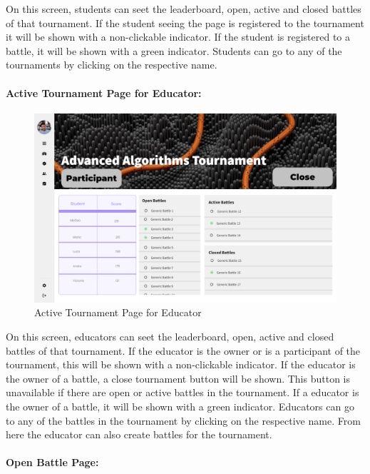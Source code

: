 \documentclass{article}
\begin{document}
On this screen, students can seet the leaderboard, open, active and closed battles of that tournament.
If the student seeing the page is registered to the tournament it will be shown with a non-clickable indicator.
If the student is registered to a battle, it will be shown with a green indicator. Students can go to any
of the tournaments by clicking on the respective name. 

\paragraph{Active Tournament Page for Educator:}

\begin{figure}[H]
    \centering
    \includegraphics[width=1\textwidth]{images/UI/Tournament Page Active Educator.png}
    \caption{Active Tournament Page for Educator}
    \label{fig:ActiveTournamentPageForEducator}
\end{figure}

On this screen, educators can seet the leaderboard, open, active and closed battles of that tournament.
If the educator is the owner or is a participant of the tournament, this will be shown with a non-clickable indicator.
If the educator is the owner of a battle, a close tournament button will be shown. This button is unavailable
if there are open or active battles in the tournament.
If a educator is the owner of a battle, it will be shown with a green indicator. Educators can go to any
of the battles in the tournament by clicking on the respective name.
From here the educator can also create battles for the tournament.

\paragraph{Open Battle Page:}
\end{document}
